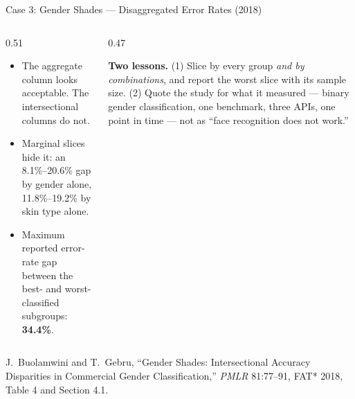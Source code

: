 \begin{frame}{Case 3: Gender Shades --- Disaggregated Error Rates (2018)}
    \vspace{0.18em}
    \raggedright
    \begin{columns}[T]
        \begin{column}{0.51\textwidth}
            \begin{itemize}\scriptsize
                \setlength\itemsep{0.1em}
                \item The aggregate column looks acceptable. The intersectional columns do not.
                \item Marginal slices hide it: an 8.1\%--20.6\% gap by gender alone, 11.8\%--19.2\%
                      by skin type alone.
                \item Maximum reported error-rate gap between the best- and worst-classified
                      subgroups: \textbf{34.4\%}.
            \end{itemize}
        \end{column}
        \begin{column}{0.47\textwidth}
            \begin{tcolorbox}[colback=raiBlue!5, colframe=raiBlue!60, boxrule=0.6pt]
                \scriptsize
                \textbf{Two lessons.} (1) Slice by every group \emph{and by combinations}, and
                report the worst slice with its sample size. (2) Quote the study for what it
                measured --- binary gender classification, one benchmark, three APIs, one point in
                time --- not as ``face recognition does not work.''
            \end{tcolorbox}
        \end{column}
    \end{columns}

    \vspace{0.12em}
    {\scriptsize J.~Buolamwini and T.~Gebru, ``Gender Shades: Intersectional Accuracy Disparities in
    Commercial Gender Classification,'' \emph{PMLR} 81:77--91, FAT* 2018, Table 4 and Section 4.1.}
\end{frame}

